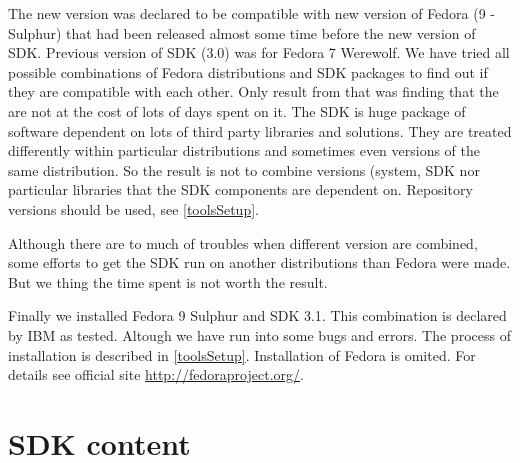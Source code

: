 \par
The new version was declared to be compatible with new version of Fedora (9 - Sulphur) that had been released almost some time before the new version of SDK.
Previous version of SDK (3.0) was for Fedora 7 Werewolf.
We have tried all possible combinations of Fedora distributions and SDK packages to find out if they are compatible with each other.
Only result from that was finding that the are not at the cost of lots of days spent on it.
The SDK is huge package of software dependent on lots of third party libraries and solutions.
They are treated differently within particular distributions and sometimes even versions of the same distribution.
So the result is not to combine versions (system, SDK nor particular libraries that the SDK components are dependent on.
Repository versions should be used, see \ref{toolsSetup}.

\par
Although there are to much of troubles when different version are combined, some efforts to get the SDK run on another distributions than Fedora were made.
But we thing the time spent is not worth the result.

\par
Finally we installed Fedora 9 Sulphur and SDK 3.1.
This combination is declared by IBM as tested.
Altough we have run into some bugs and errors.
The process of installation is described in \ref{toolsSetup}.
Installation of Fedora is omited.
For details see official site \url{http://fedoraproject.org/}.

\section {SDK content}


